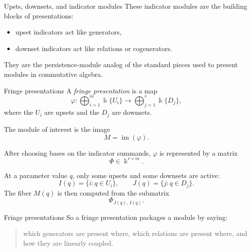 \documentclass[aspectratio=169,11pt]{beamer}
\newcommand{\kk}{\Bbbk}
\begin{document}
\begin{frame}{Upsts, downsets, and indicator modules}
	\vspace{0.4em}
	These indicator modules are the building blocks of presentations:
	\begin{itemize}
		\item upset indicators act like generators,
		\item downset indicators act like relations or cogenerators.
	\end{itemize}
	
	\vspace{0.4em}
	They are the persistence-module analog of the standard pieces used to
	present modules in commutative algebra.
\end{frame}

\begin{frame}{Fringe presentations}
	\small
	A \emph{fringe presentation} is a map
	\[
	\varphi :
	\bigoplus_{i=1}^{m} \kk\{U_i\}
	\longrightarrow
	\bigoplus_{j=1}^{r} \kk\{D_j\},
	\]
	where the $U_i$ are upsets and the $D_j$ are downsets.
	
	\vspace{0.5em}
	The module of interest is the image
	\[
	M = \operatorname{im}(\varphi).
	\]
	
	\vspace{0.5em}
	After choosing bases on the indicator summands, $\varphi$ is represented by
	a matrix
	\[
	\Phi \in \kk^{r\times m}.
	\]
	
	\vspace{0.5em}
	At a parameter value $q$, only some upsets and some downsets are active:
	\[
	I(q)=\{i : q \in U_i\}, \qquad J(q)=\{j : q \in D_j\}.
	\]
	The fiber $M(q)$ is then computed from the submatrix
	\[
	\Phi_{J(q),\,I(q)}.
	\]
\end{frame}

\begin{frame}{Fringe presentations}
	\vspace{0.5em}
	So a fringe presentation packages a module by saying:
	\begin{quote}
		which generators are present where, which relations are present where,
		and how they are linearly coupled.
	\end{quote}
\end{frame}
\end{document}
